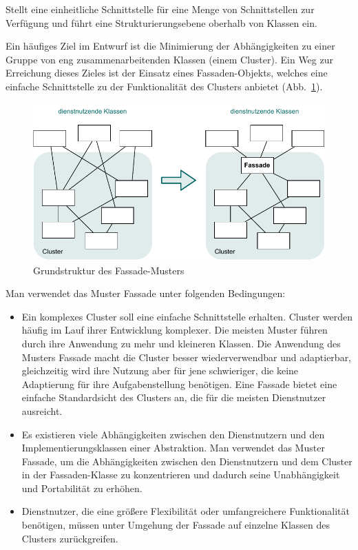 \begin{description}
	\setlength{\itemsep}{2mm} %
	
	\item[Zweck] Stellt eine einheitliche Schnittstelle für eine Menge von Schnittstellen zur Verfügung und führt eine Strukturierungsebene oberhalb von Klassen ein.
	\item[Motivation] Ein häufiges Ziel im Entwurf ist die Minimierung der Abhängigkeiten zu einer Gruppe von eng zusammenarbeitenden Klassen (einem Cluster). Ein Weg zur Erreichung dieses Zieles ist der Einsatz eines Fassaden-Objekts, welches eine einfache Schnittstelle zu der Funktionalität des Clusters anbietet (Abb.~\ref{fig:muster_fassade}).
	
\clearpage %

\vspace*{2mm} %

	\begin{figure}[h!]
		\centering
		\includegraphics{Bilder/Kapitel-10/muster_fassade.pdf}
		\caption{Grundstruktur des Fassade-Musters}
		\label{fig:muster_fassade}
	\end{figure}

	\item[Anwendbarkeit] Man verwendet das Muster Fassade unter folgenden Bedingungen:
	\begin{itemize}
		\item 	Ein komplexes Cluster soll eine einfache Schnittstelle erhalten. Cluster werden häufig im Lauf ihrer Entwicklung komplexer. Die meisten Muster führen durch ihre Anwendung zu mehr und kleineren Klassen. Die Anwendung des Musters Fassade macht die Cluster besser wiederverwendbar und adaptierbar, gleichzeitig wird ihre Nutzung aber für jene schwieriger, die keine Adaptierung für ihre Aufgabenstellung benötigen. Eine Fassade bietet eine einfache Standardsicht des Clusters an, die für die meisten Dienstnutzer ausreicht.
		\item 	Es existieren viele Abhängigkeiten zwischen den Dienstnutzern und den Implementierungsklassen einer Abstraktion. Man verwendet das Muster Fassade, um die Abhängigkeiten zwischen den Dienstnutzern und dem Cluster in der Fassaden-Klasse zu konzentrieren und dadurch seine Unabhängigkeit und Portabilität zu erhöhen.
		\item 	Dienstnutzer, die eine größere Flexibilität oder umfangreichere Funktionalität benötigen, müssen unter Umgehung der Fassade auf einzelne Klassen des Clusters zurückgreifen.
	\end{itemize}
	

\end{description}

